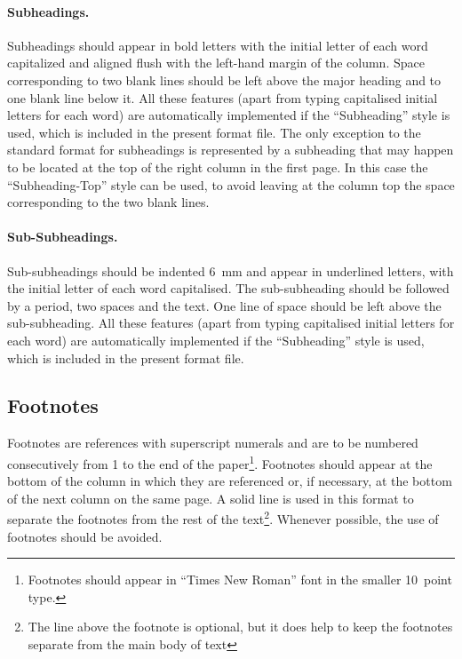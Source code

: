 \documentclass[bibtex,pagenumbers]{stabs2021}
\begin{document}
\paragraph{Subheadings.}

Subheadings should appear in bold letters with the initial letter of
each word capitalized and aligned flush with the left-hand margin of
the column. Space corresponding to two blank lines should be left
above the major heading and to one blank line below it. All these
features (apart from typing capitalised initial letters for each word)
are automatically implemented if the ``Subheading'' style is used,
which is included in the present format file. The only exception to
the standard format for subheadings is represented by a subheading
that may happen to be located at the top of the right column in the
first page. In this case the ``Subheading-Top'' style can be used, to
avoid leaving at the column top the space corresponding to the two
blank lines.

\paragraph{Sub-Subheadings.}

Sub-subheadings should be indented 6~mm and appear in underlined
letters, with the initial letter of each word capitalised. The
sub-subheading should be followed by a period, two spaces and the
text. One line of space should be left above the sub-subheading. All
these features (apart from typing capitalised initial letters for each
word) are automatically implemented if the ``Subheading'' style is
used, which is included in the present format file.

\subsection{Footnotes}

Footnotes are references with superscript numerals and are to be
numbered consecutively from 1 to the end of the
paper\footnote{Footnotes should appear in ``Times New Roman'' font in
the smaller 10~point type.}. Footnotes should appear at the bottom of
the column in which they are referenced or, if necessary, at the
bottom of the next column on the same page. A solid line is used in
this format to separate the footnotes from the rest of the
text\footnote{The line above the footnote is optional, but it does
help to keep the footnotes separate from the main body of text}.
Whenever possible, the use of footnotes should be avoided.
\end{document}
